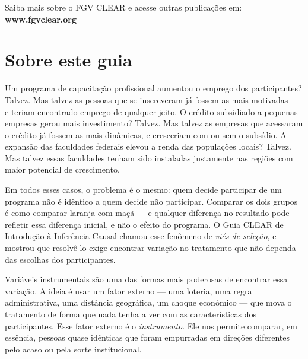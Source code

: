 \documentclass[12pt, a4paper, openany]{book}
\numberwithin{equation}{chapter}
\numberwithin{table}{chapter}
\numberwithin{figure}{chapter}
\begin{document}
\medskip

\noindent Saiba mais sobre o FGV CLEAR e acesse outras publica\c{c}\~oes em: \textbf{www.fgvclear.org}

\vfill


\newpage

\thispagestyle{empty}
\section*{Sobre este guia}

Um programa de capacitação profissional aumentou o emprego dos participantes? Talvez. Mas talvez as pessoas que se inscreveram já fossem as mais motivadas --- e teriam encontrado emprego de qualquer jeito. O crédito subsidiado a pequenas empresas gerou mais investimento? Talvez. Mas talvez as empresas que acessaram o crédito já fossem as mais dinâmicas, e cresceriam com ou sem o subsídio. A expansão das faculdades federais elevou a renda das populações locais? Talvez. Mas talvez essas faculdades tenham sido instaladas justamente nas regiões com maior potencial de crescimento.

Em todos esses casos, o problema é o mesmo: quem decide participar de um programa não é idêntico a quem decide não participar. Comparar os dois grupos é como comparar laranja com maçã --- e qualquer diferença no resultado pode refletir essa diferença inicial, e não o efeito do programa. O Guia CLEAR de Introdução à Inferência Causal chamou esse fenômeno de \textit{viés de seleção}, e mostrou que resolvê-lo exige encontrar variação no tratamento que não dependa das escolhas dos participantes.

Variáveis instrumentais são uma das formas mais poderosas de encontrar essa variação. A ideia é usar um fator externo --- uma loteria, uma regra administrativa, uma distância geográfica, um choque econômico --- que mova o tratamento de forma que nada tenha a ver com as características dos participantes. Esse fator externo é o \textit{instrumento}. Ele nos permite comparar, em essência, pessoas quase idênticas que foram empurradas em direções diferentes pelo acaso ou pela sorte institucional.
\end{document}
